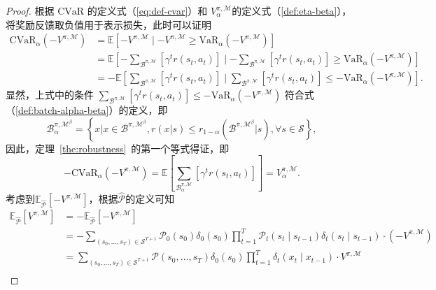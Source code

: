 \begin{proof}
根据 $\mathrm{CVaR}$ 的定义式（\ref{eq:def-cvar}）和 $V_\alpha^{\pi,\mathcal{M}}$的定义式（\ref{def:eta-beta}），将奖励反馈取负值用于表示损失，此时可以证明
\begin{equation}
\begin{aligned}
\mathrm{CVaR}_\alpha(-V^{\pi,\mathcal{M}}) &= \mathbb{E}\left[-V^{\pi,\mathcal{M}}\mid -V^{\pi,\mathcal{M}} \geq \mathrm{VaR}_\alpha(-V^{\pi,\mathcal{M}})\right]\\
&=\mathbb{E}\left[-{\sum}_{\mathcal{B}^{\pi,\mathcal{M}}}\left[\gamma^t r(s_t,a_t)\right]\mid -{\sum}_{\mathcal{B}^{\pi,\mathcal{M}}}\left[\gamma^t r(s_t,a_t)\right] \geq \mathrm{VaR}_\alpha(-V^{\pi,\mathcal{M}})\right]\\
&=-\mathbb{E}\left[{\sum}_{\mathcal{B}^{\pi,\mathcal{M}}}\left[\gamma^t r(s_t,a_t)\right]\mid {\sum}_{\mathcal{B}^{\pi,\mathcal{M}}}\left[\gamma^t r(s_t,a_t)\right] \leq -\mathrm{VaR}_\alpha(-V^{\pi,\mathcal{M}})\right].
\end{aligned}
\end{equation}
显然，上式中的条件 ${\sum}_{\mathcal{B}^{\pi,\mathcal{M}}}\left[\gamma^t r(s_t,a_t)\right] \leq -\mathrm{VaR}_\alpha(-V^{\pi,\mathcal{M}})$ 符合式（\ref{def:batch-alpha-beta}）的定义，即
\begin{equation}\label{def:batch-alpha-beta}
    \mathcal{B}_\alpha^{\pi,\mathcal{M}^\beta}=\left\{x|x\in\mathcal{B}^{\pi,\mathcal{M}^\beta},r(x|s)\leq r_{1-\alpha}(\mathcal{B}^{\pi,\mathcal{M}^\beta}|s), \forall s \in \mathcal{S}\right\},
\end{equation}
因此，定理~\ref{the:robustness}~的第一个等式得证，即
\begin{equation}
-\mathrm{CVaR}_\alpha(-V^{\pi,\mathcal{M}}) = \mathbb{E}\left[{\sum}_{\mathcal{B}_\alpha^{\pi,\mathcal{M}}}\left[\gamma^t r(s_t,a_t)\right]\right] = V_\alpha^{\pi,\mathcal{M}}.
\end{equation}
考虑到$\mathbb{E}_{\hat{\mathcal{P}}}[-V^{\pi,\mathcal{M}}]$，根据$\hat{\mathcal{P}}$的定义可知
\begin{equation}
\begin{aligned}
    \mathbb{E}_{\hat{\mathcal{P}}}[V^{\pi,\mathcal{M}}] &= -\mathbb{E}_{\hat{\mathcal{P}}}[-V^{\pi,\mathcal{M}}]\\
    &= -\sum_{(s_0,\ldots,s_T)\in\mathcal{S}^{T+1}}\mathcal{P}_0(s_0)\delta_0(s_0)\prod_{t=1}^{T}\mathcal{P}_t(s_t\mid s_{t-1})\delta_t(s_t\mid s_{t-1})\cdot (-V^{\pi,\mathcal{M}})\\
    &= \sum_{(s_0,\ldots,s_T)\in\mathcal{S}^{T+1}}\mathcal{P}(s_0,\ldots,s_T)\delta_0(s_0)\prod_{t=1}^{T}\delta_t(x_t\mid x_{t-1})\cdot V^{\pi,\mathcal{M}}\\

\end{aligned}
\end{equation}
\end{proof}
